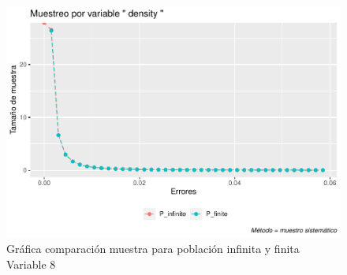 \documentclass[
]{article}
\begin{document}
\begin{figure}
\centering
\includegraphics{1_examen_solucion_files/figure-latex/grafica sys8-1.pdf}
\caption{Gráfica comparación muestra para población infinita y finita
Variable 8}
\end{figure}
\end{document}
